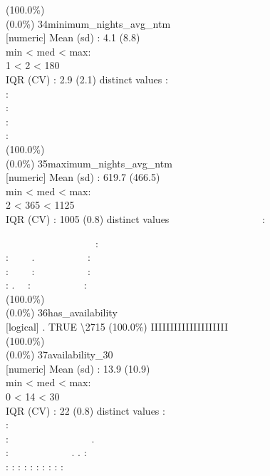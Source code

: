 \documentclass[
  journal,
]{IEEEtran}%
\begin{document}
(100.0\%) \\
(0.0\%) \textbar{} \textbar{} 34\textbar minimum\_nights\_avg\_ntm\\
{[}numeric{]} \textbar Mean (sd) : 4.1 (8.8)\\
min \textless{} med \textless{} max:\\
1 \textless{} 2 \textless{} 180\\
IQR (CV) : 2.9 (2.1)  distinct values \textbar{} \textbar:\\
:\\
:\\
:\\
: \\
(100.0\%) \\
(0.0\%) \textbar{} \textbar{} 35\textbar maximum\_nights\_avg\_ntm\\
{[}numeric{]} \textbar Mean (sd) : 619.7 (466.5)\\
min \textless{} med \textless{} max:\\
2 \textless{} 365 \textless{} 1125\\
IQR (CV) : 1005 (0.8)  distinct values \textbar{}
\textbar~~~~~~~~~~~~~~~~~~:\\
\strut ~~~~~~~~~~~~~~~~~~:\\
: ~~~~. ~~~~~~~~~~:\\
: ~~~~: ~~~~~~~~~~:\\
: . ~~: ~~~~~~~~~~: \\
(100.0\%) \\
(0.0\%) \textbar{} \textbar{} 36\textbar has\_availability\\
{[}logical{]} . TRUE \textbar\textbackslash2715 (100.0\%)
\textbar{} \textbar IIIIIIIIIIIIIIIIIIII \\
(100.0\%) \\
(0.0\%) \textbar{} \textbar{} 37\textbar availability\_30\\
{[}numeric{]} \textbar Mean (sd) : 13.9 (10.9)\\
min \textless{} med \textless{} max:\\
0 \textless{} 14 \textless{} 30\\
IQR (CV) : 22 (0.8)  distinct values \textbar{} \textbar:\\
:\\
: ~~~~~~~~~~~~~~~~.\\
: ~~~~~~~~~~~~. . :\\
: : : : : : : : : : \\
\end{document}
